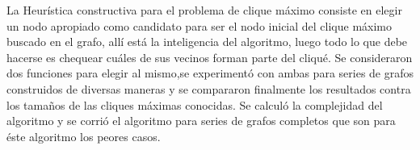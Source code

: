 La Heurística constructiva para el problema de clique máximo consiste en elegir un nodo apropiado como candidato para ser el nodo inicial del clique máximo buscado en el grafo, allí está la inteligencia del algoritmo, luego todo lo que debe hacerse es chequear cuáles de sus vecinos forman parte del cliqué.
Se consideraron dos funciones para elegir al mismo,se experimentó con ambas para series de grafos construidos de diversas maneras y se compararon finalmente los resultados contra los tamaños de las cliques máximas conocidas.
Se calculó la complejidad del algoritmo y se corrió el algoritmo para series de grafos completos que son para éste algoritmo los peores casos.
 